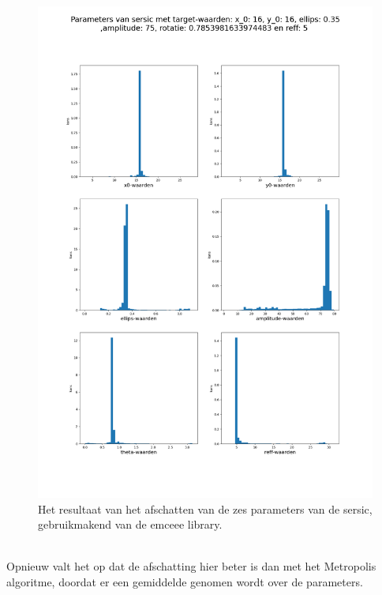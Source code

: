 \begin{figure}
    \centering
    \includegraphics[width=0.95\linewidth]{Figures/emcee_hist_1200_230.png}
    \caption{Het resultaat van het afschatten van de zes parameters van de sersic, gebruikmakend van de emceee library.}
    \label{fig: emcee}
\end{figure}\mbox{}\\
Opnieuw valt het op dat de afschatting hier beter is dan met het Metropolis algoritme, doordat er een gemiddelde genomen wordt over de parameters. 


